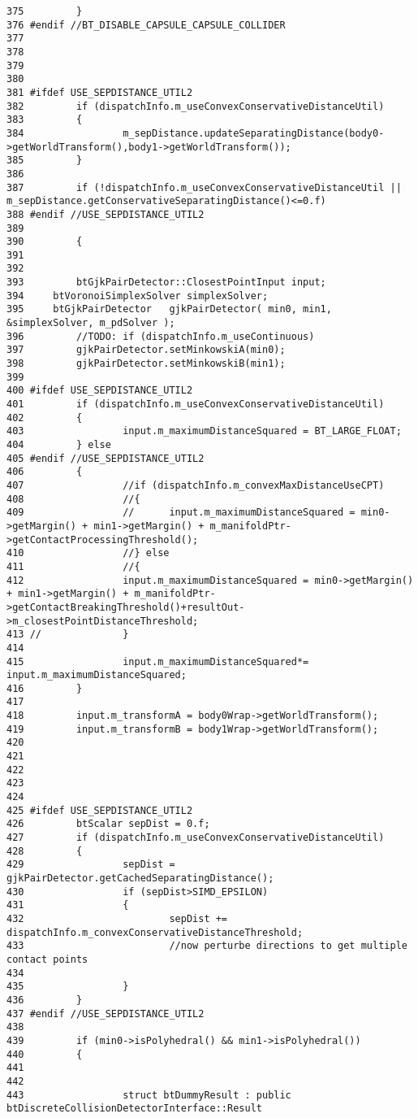 \begin{Code}
\begin{verbatim}
375         }
376 #endif //BT_DISABLE_CAPSULE_CAPSULE_COLLIDER
377 
378 
379 
380 
381 #ifdef USE_SEPDISTANCE_UTIL2
382         if (dispatchInfo.m_useConvexConservativeDistanceUtil)
383         {
384                 m_sepDistance.updateSeparatingDistance(body0->getWorldTransform(),body1->getWorldTransform());
385         }
386 
387         if (!dispatchInfo.m_useConvexConservativeDistanceUtil || m_sepDistance.getConservativeSeparatingDistance()<=0.f)
388 #endif //USE_SEPDISTANCE_UTIL2
389 
390         {
391 
392         
393         btGjkPairDetector::ClosestPointInput input;
394     btVoronoiSimplexSolver simplexSolver;
395     btGjkPairDetector   gjkPairDetector( min0, min1, &simplexSolver, m_pdSolver );
396         //TODO: if (dispatchInfo.m_useContinuous)
397         gjkPairDetector.setMinkowskiA(min0);
398         gjkPairDetector.setMinkowskiB(min1);
399 
400 #ifdef USE_SEPDISTANCE_UTIL2
401         if (dispatchInfo.m_useConvexConservativeDistanceUtil)
402         {
403                 input.m_maximumDistanceSquared = BT_LARGE_FLOAT;
404         } else
405 #endif //USE_SEPDISTANCE_UTIL2
406         {
407                 //if (dispatchInfo.m_convexMaxDistanceUseCPT)
408                 //{
409                 //      input.m_maximumDistanceSquared = min0->getMargin() + min1->getMargin() + m_manifoldPtr->getContactProcessingThreshold();
410                 //} else
411                 //{
412                 input.m_maximumDistanceSquared = min0->getMargin() + min1->getMargin() + m_manifoldPtr->getContactBreakingThreshold()+resultOut->m_closestPointDistanceThreshold;
413 //              }
414 
415                 input.m_maximumDistanceSquared*= input.m_maximumDistanceSquared;
416         }
417 
418         input.m_transformA = body0Wrap->getWorldTransform();
419         input.m_transformB = body1Wrap->getWorldTransform();
420 
421 
422 
423         
424 
425 #ifdef USE_SEPDISTANCE_UTIL2
426         btScalar sepDist = 0.f;
427         if (dispatchInfo.m_useConvexConservativeDistanceUtil)
428         {
429                 sepDist = gjkPairDetector.getCachedSeparatingDistance();
430                 if (sepDist>SIMD_EPSILON)
431                 {
432                         sepDist += dispatchInfo.m_convexConservativeDistanceThreshold;
433                         //now perturbe directions to get multiple contact points
434                         
435                 }
436         }
437 #endif //USE_SEPDISTANCE_UTIL2
438 
439         if (min0->isPolyhedral() && min1->isPolyhedral())
440         {
441 
442 
443                 struct btDummyResult : public btDiscreteCollisionDetectorInterface::Result

\end{verbatim}
\end{Code}
